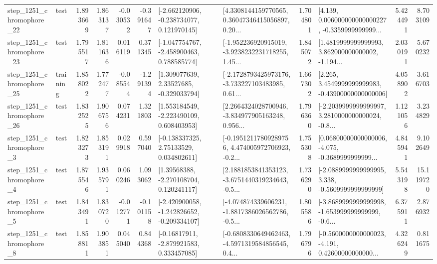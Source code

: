 \begin{tabular}{llrrrrllrlrr}
 step\_1251\_chromophore\_22 &      test &      1.893669 &    1.863137 &     -0.030532 & -0.391647 &   [-2.662120906, -0.238734077, 0.121970145] &  [4.3308144159770565, 0.36047346415056897, 0.20... &       1.704801 &  [4.139, 0.006000000000000227, -0.3359999999999... &            5.424491 &          8.703109 \\
 step\_1251\_chromophore\_23 &      test &      1.795517 &    1.811636 &      0.016119 &  0.371345 &   [-1.047754767, -2.458900463, 0.788585774] &  [-1.952236920915019, -3.9238232231718255, 1.45... &       1.845072 &  [1.4819999999999993, 3.862000000000002, -1.194... &            2.030191 &          5.670232 \\
 step\_1251\_chromophore\_25 &  training &      1.858022 &    1.772477 &     -0.085544 & -1.291394 &     [1.309077639, 2.33527685, -0.329033794] &  [-2.1728793425973176, -3.733227103483985, 0.61... &       1.667302 &  [2.265, 3.4549999999999983, -0.43900000000000006] &            4.058902 &          3.616703 \\
 step\_1251\_chromophore\_26 &      test &      1.832525 &    1.906756 &      0.074231 &  1.321803 &    [1.553184549, -2.223490109, 0.608403953] &  [2.2664324028700946, -3.834977905163248, 0.956... &       1.796360 &  [-2.2039999999999997, 3.2810000000000024, -0.8... &            1.121056 &          3.234829 \\
  step\_1251\_chromophore\_3 &      test &      1.823273 &    1.853191 &      0.029918 &  0.597040 &     [-0.138337325, 2.75133529, 0.034802611] &  [-0.19512117809289756, 4.474005972706923, -0.2... &       1.755308 &  [0.06800000000000006, -4.075, -0.3689999999999... &            4.845941 &          9.102649 \\
  step\_1251\_chromophore\_4 &      test &      1.875546 &    1.935791 &      0.060246 &  1.093062 &     [1.39568388, -2.270108704, 0.120241117] &  [2.1881853841353123, -3.6751440319234643, -0.5... &       1.736290 &  [-2.0889999999999995, 3.338, -0.5609999999999999] &            5.543198 &         15.119720 \\
  step\_1251\_chromophore\_5 &      test &      1.843491 &    1.830720 &     -0.012771 & -0.101158 &  [-2.420900058, -1.242826652, -0.209334107] &  [-4.074874339606231, -1.8817386026562786, -0.5... &       1.805586 &  [-3.8689999999999998, -1.653999999999999, -0.6... &            6.375911 &          2.876932 \\
  step\_1251\_chromophore\_8 &      test &      1.858811 &    1.903851 &      0.045040 &  0.844368 &    [-0.16817911, -2.879921583, 0.333457085] &  [-0.6808330649462463, -4.5971319584856545, 0.4... &       1.796796 &  [-0.5600000000000023, -4.191, 0.42600000000000... &            4.326249 &          0.811675 \\

\end{tabular}
